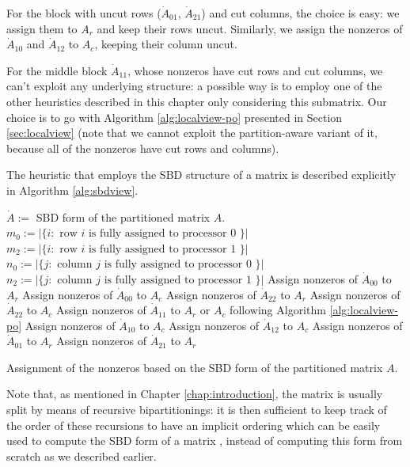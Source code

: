 For the block with uncut rows ($\dot{A}_{01}$, $\dot{A}_{21}$) and cut columns, the choice is easy: we assign them to $A_r$ and keep their rows uncut. Similarly, we assign the nonzeros of $\dot{A}_{10}$ and $\dot{A}_{12}$ to $A_c$, keeping their column uncut. 

For the middle block $\dot{A}_{11}$, whose nonzeros have cut rows and cut columns, we can't exploit any underlying structure: a possible way is to employ one of the other heuristics described in this chapter only considering this submatrix. Our choice is to go with Algorithm \ref{alg:localview-po} presented in Section \ref{sec:localview} (note that we cannot exploit the partition-aware variant of it, because all of the nonzeros have cut rows and columns).

The heuristic that employs the SBD structure of a matrix is described explicitly in Algorithm \ref{alg:sbdview}.

\begin{algorithm}[h]
	\begin{algorithmic}
		\State
		\State $\dot{A}:=$ SBD form of the partitioned matrix $A$.
		\State $m_0 := |\{ i : \text{ row } i \text{ is fully assigned to processor 0 } \}|$
		\State $m_2 := |\{ i : \text{ row } i \text{ is fully assigned to processor 1 } \}|$
		\State $n_0 := |\{ j : \text{ column } j \text{ is fully assigned to processor 0 } \}|$
		\State $n_2 := |\{ j : \text{ column } j \text{ is fully assigned to processor 1 } \}|$
		\State
		\State Assign nonzeros of $\dot{A}_{00}$ to $A_r$
		\Else
		\State Assign nonzeros of $\dot{A}_{00}$ to $A_c$
		\EndIf
		\State Assign nonzeros of $\dot{A}_{22}$ to $A_r$
		\Else
		\State Assign nonzeros of $\dot{A}_{22}$ to $A_c$
		\EndIf
		\State Assign nonzeros of $\dot{A}_{11}$ to $A_r$ or $A_c$ following Algorithm \ref{alg:localview-po}
		\State Assign nonzeros of $\dot{A}_{10}$ to $A_c$
		\State Assign nonzeros of $\dot{A}_{12}$ to $A_c$
		\State Assign nonzeros of $\dot{A}_{01}$ to $A_r$
		\State Assign nonzeros of $\dot{A}_{21}$ to $A_r$
	\end{algorithmic}
	\caption{Assignment of the nonzeros based on the SBD form of the partitioned matrix $A$.} \label{alg:sbdview}
\end{algorithm}

Note that, as mentioned in Chapter \ref{chap:introduction}, the matrix is usually split by means of recursive bipartitionings: it is then sufficient to keep track of the order of these recursions to have an implicit ordering which can be easily used to compute the SBD form of a matrix \cite{yzelman_cache}, instead of computing this form from scratch as we described earlier.

